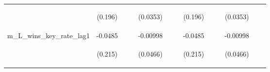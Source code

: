 \documentclass[]{article}
\begin{document}
\begin{center}
\begin{tabular}{lcccccccccccc}
\vspace{4pt} & \begin{footnotesize}(0.196)\end{footnotesize} & \begin{footnotesize}\end{footnotesize} & \begin{footnotesize}\end{footnotesize} & \begin{footnotesize}(0.0353)\end{footnotesize} & \begin{footnotesize}\end{footnotesize} & \begin{footnotesize}\end{footnotesize} & \begin{footnotesize}(0.196)\end{footnotesize} & \begin{footnotesize}\end{footnotesize} & \begin{footnotesize}\end{footnotesize} & \begin{footnotesize}(0.0353)\end{footnotesize} & \begin{footnotesize}\end{footnotesize} & \begin{footnotesize}\end{footnotesize} \\
m\_L\_wins\_key\_rate\_lag1 & -0.0485 &  &  & -0.00998 &  &  & -0.0485 &  &  & -0.00998 &  &  \\
\vspace{4pt} & \begin{footnotesize}(0.215)\end{footnotesize} & \begin{footnotesize}\end{footnotesize} & \begin{footnotesize}\end{footnotesize} & \begin{footnotesize}(0.0466)\end{footnotesize} & \begin{footnotesize}\end{footnotesize} & \begin{footnotesize}\end{footnotesize} & \begin{footnotesize}(0.215)\end{footnotesize} & \begin{footnotesize}\end{footnotesize} & \begin{footnotesize}\end{footnotesize} & \begin{footnotesize}(0.0466)\end{footnotesize} & \begin{footnotesize}\end{footnotesize} & \begin{footnotesize}\end{footnotesize} \\

\end{tabular}
\end{center}
\end{document}

